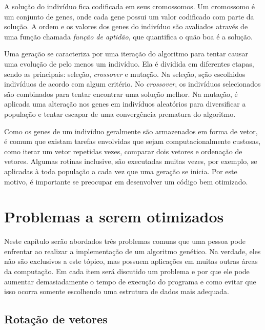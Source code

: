 \documentclass[12pt]{article}
\begin{document}
A solu\c{c}\~{a}o do indiv\'{i}duo fica codificada em seus cromossomos. Um cromossomo \'{e} um conjunto de genes,
onde cada gene possui um valor codificado com parte da solu\c{c}\~{a}o. A ordem e os valores dos genes do
indiv\'{i}duo s\~{a}o avaliados atrav\'{e}s de uma fun\c{c}\~{a}o chamada \textit{fun\c{c}\~{a}o de aptid\~{a}o}, que
quantifica o qu\~{a}o boa \'{e} a solu\c{c}\~{a}o.

Uma gera\c{c}\~{a}o se caracteriza por uma itera\c{c}\~{a}o do algoritmo para tentar causar uma evolu\c{c}\~{a}o de
pelo menos um indiv\'{i}duo. Ela \'{e} dividida em diferentes etapas, sendo as principais: sele\c{c}\~{a}o,
\textit{crossover} e muta\c{c}\~{a}o. Na sele\c{c}\~{a}o, s\c{c}\~{a}o escolhidos indiv\'{i}duos de acordo com algum
crit\'{e}rio. No \textit{crossover}, os indiv\'{i}duos selecionados s\~{a}o combinados para tentar encontrar
uma solu\c{c}\~{a}o melhor. Na muta\c{c}\~{a}o, \'{e} aplicada uma altera\c{c}\~{a}o nos genes em indiv\'{i}duos
aleat\'{o}rios para diversificar a popula\c{c}\~{a}o e tentar escapar de uma converg\^{e}ncia prematura do algoritmo.

Como os genes de um indiv\'{i}duo geralmente s\~{a}o armazenados em forma de vetor, \'{e} comum
que existam tarefas envolvidas que sejam computacionalmente custosas, como iterar um vetor repetidas
vezes, comparar dois vetores e ordena\c{c}\~{a}o de vetores. Algumas rotinas inclusive, s\~{a}o executadas muitas
vezes, por exemplo, se aplicadas \`{a} toda popula\c{c}\~{a}o a cada vez que uma gera\c{c}\~{a}o se inicia. Por este motivo,
\'{e} importante se preocupar em desenvolver um c\'{o}digo bem otimizado.

\section{Problemas a serem otimizados}

Neste cap\'{i}tulo ser\~{a}o abordados tr\^{e}s problemas comuns que uma pessoa pode enfrentar ao
realizar a implementa\c{c}\~{a}o de um algoritmo gen\'{e}tico. Na verdade, eles n\~{a}o s\~{a}o
exclusivos a este t\'{o}pico, mas possuem aplica\c{c}\~{o}es em muitas outras \'{a}reas
da computa\c{c}\~{a}o. Em cada item ser\'{a} discutido um problema e por que ele
pode aumentar demasiadamente o tempo de execu\c{c}\~{a}o do programa e como evitar que
isso ocorra somente escolhendo uma estrutura de dados mais adequada.

\subsection{Rota\c{c}\~{a}o de vetores}
\end{document}
